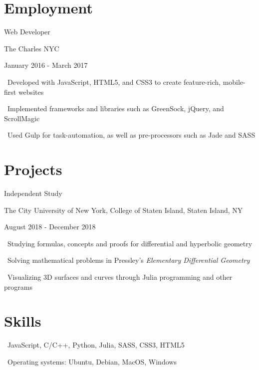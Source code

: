 \documentclass[letterpaper]{article}
\renewenvironment{itemize}{
  \begin{list}{}{
    \setlength{\leftmargin}{1.5em}
  }
}{
  \end{list}
}
\begin{document}
\section*{Employment}

\begin{itemize}
\item Web Developer

The Charles NYC

January 2016 - March 2017
  \begin{itemize}
    \item \textperiodcentered \ Developed with JavaScript, HTML5, and CSS3 to create feature-rich, mobile-first websites
    \item \textperiodcentered \ Implemented frameworks and libraries such as GreenSock, jQuery, and ScrollMagic
    \item \textperiodcentered \ Used Gulp for task-automation, as well as pre-processors such as Jade and SASS
  \end{itemize}
\end{itemize}

\section*{Projects}

\begin{itemize}
  \item Independent Study
  
  The City University of New York, College of Staten Island, Staten Island, NY
  
  August 2018 - December 2018

  \begin{itemize}
    \item \textperiodcentered \ Studying formulas, concepts and proofs for differential and hyperbolic geometry
    \item \textperiodcentered \ Solving mathematical problems in Pressley's \emph{Elementary Differential Geometry}
    \item \textperiodcentered \ Visualizing 3D surfaces and curves through Julia programming and other programs
  \end{itemize}
\end{itemize}

\section*{Skills}
\begin{itemize}
  \item \textperiodcentered \ JavaScript, C/C++, Python, Julia, SASS, CSS3, HTML5
  \item \textperiodcentered \ Operating systems: Ubuntu, Debian, MacOS, Windows
\end{itemize}

\bigskip
\end{document}
